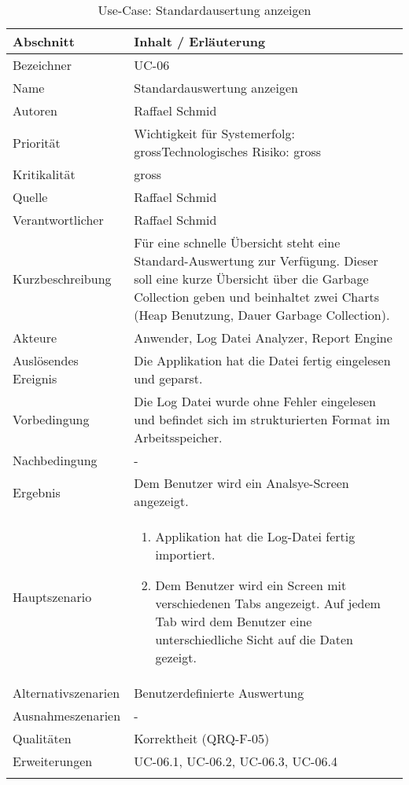 \begin{longtable}{|p{4cm}|p{10.5cm}|}
\hline
   \textbf{Abschnitt} & \textbf{Inhalt / Erläuterung} \\\hline
   Bezeichner & UC-06\\\hline
   Name & Standardauswertung anzeigen\\\hline
   Autoren & Raffael Schmid\\\hline
   Priorität & Wichtigkeit für Systemerfolg: gross\newline Technologisches Risiko: gross\\\hline
   Kritikalität & gross\\\hline
   Quelle & Raffael Schmid\\\hline
   Verantwortlicher & Raffael Schmid\\\hline
   Kurzbeschreibung & Für eine schnelle Übersicht steht eine Standard-Auswertung zur Verfügung. Dieser soll eine kurze Übersicht über die Garbage Collection geben und beinhaltet zwei Charts (Heap Benutzung, Dauer Garbage Collection). \\\hline
   Akteure & Anwender, Log Datei Analyzer, Report Engine\\\hline
   Auslösendes Ereignis & Die Applikation hat die Datei fertig eingelesen und geparst.\\\hline
   Vorbedingung & Die Log Datei wurde ohne Fehler eingelesen und befindet sich im strukturierten Format im Arbeitsspeicher.\\\hline
   Nachbedingung & -\\\hline
   Ergebnis & Dem Benutzer wird ein Analsye-Screen angezeigt.\\\hline
   Hauptszenario & 
	\begin{enumerate}
		\item Applikation hat die Log-Datei fertig importiert.
		\item Dem Benutzer wird ein Screen mit verschiedenen Tabs angezeigt. Auf jedem Tab wird dem Benutzer eine unterschiedliche Sicht auf die Daten gezeigt.
	\end{enumerate}
	\\\hline
   Alternativszenarien & Benutzerdefinierte Auswertung\\\hline
   Ausnahmeszenarien & -\\\hline
   Qualitäten & Korrektheit (QRQ-F-05)\\\hline
   Erweiterungen & UC-06.1, UC-06.2, UC-06.3, UC-06.4 \\\hline
\caption{Use-Case: Standardausertung anzeigen}
\end{longtable}

